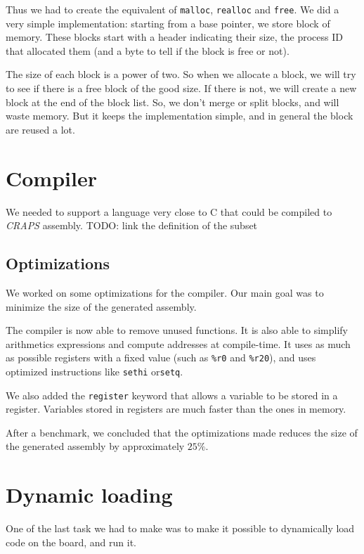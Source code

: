 \documentclass[openany, a4paper]{book}
\begin{document}
      Thus we had to create the equivalent of \verb+malloc+, \verb+realloc+ and
      \verb+free+. We did a very
      simple implementation: starting from a base pointer, we store block of
      memory. These blocks start with a header indicating their size, the
      process ID that allocated them (and a byte to tell if the block is free or
      not).

      The size of each block is a power of two. So when we allocate a block, we
      will try to see if there is a free block of the good size. If there is
      not, we will create a new block at the end of the block list.
      So, we don't merge or split blocks, and will waste memory. But it keeps
      the implementation simple, and in general the block are reused a lot.

    \section{Compiler}
      We needed to support a language very close to C that could be compiled to
      \emph{CRAPS} assembly.
      TODO: link the definition of the subset

      \subsection{Optimizations}
      We worked on some optimizations for the compiler. Our main goal was to
      minimize the size of the generated assembly.

      The compiler is now able to remove unused functions. It is also able to
      simplify arithmetics expressions and compute addresses at compile-time.
      It uses as much as possible registers with a fixed value (such as
      \verb+%r0+ and \verb+%r20+), and uses optimized instructions like
      \verb+sethi+ or\verb+setq+.

      We also added the \verb+register+ keyword that allows a variable to
      be stored in a register. Variables stored in registers are much faster
      than the ones in memory.

      After a benchmark, we concluded that the optimizations made reduces the
      size of the generated assembly by approximately $25\%$.

    \section{Dynamic loading}
      One of the last task we had to make was to make it possible to
      dynamically load code on the board, and run it.
\end{document}
